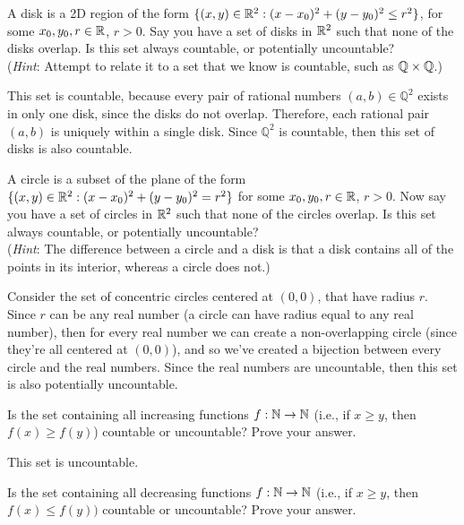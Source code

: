 \documentclass[11pt]{article}
\begin{document}
\begin{Parts}
    \Part
    A disk is a 2D region of the form $\{(x, y) \in \mathbb{R}^2 : (x - x_0)^2 + (y - y_0)^2 \le r^2\}$, for some $x_0, y_0, r \in \mathbb{R}$, $r > 0$.
    Say you have a set of disks in $\mathbb{R}^2$ such that none of the disks overlap.
    Is this set always countable, or potentially uncountable?\\
    (\textit{Hint}: Attempt to relate it to a set that we know is countable, such as $\mathbb{Q} \times \mathbb{Q}$.)

    \begin{solution}
      This set is countable, because every pair of rational numbers $(a, b) \in \mathbb Q^2$ exists in only one disk, since the disks do not overlap. Therefore, each rational pair $(a, b)$ is uniquely within a single disk. Since $\mathbb Q^2$ is countable, then this set of disks is also countable.
    \end{solution}
    
    \Part
    A circle is a subset of the plane of the form $\{(x, y) \in \mathbb{R}^2 : (x - x_0)^2 + (y - y_0)^2 = r^2\}$ for some $x_0, y_0, r \in \mathbb{R}$, $r > 0$. 
    Now say you have a set of circles in $\mathbb{R}^2$ such that none of the circles overlap.
    Is this set always countable, or potentially uncountable?\\
    (\textit{Hint}: The difference between a circle and a disk is that a disk contains all of the points in its interior, whereas a circle does not.)
    
    \begin{solution}
      Consider the set of concentric circles centered at $(0, 0)$, that have radius $r$. Since $r$ can be any real number (a circle can have radius equal to any real number), then for every real number we can create a non-overlapping circle (since they're all centered at $(0, 0)$), and so we've created a bijection between every circle and the real numbers. Since the real numbers are uncountable, then this set is also potentially uncountable.
    \end{solution}
    
    \Part
    Is the set containing all increasing functions $f : \mathbb{N} \rightarrow \mathbb{N}$ (i.e., if $x \geq y $, then $f(x) \geq f(y)$) countable or uncountable? Prove your answer.

    \begin{solution}
      This set is uncountable. 
    \end{solution}
    
    \Part
    Is the set containing all decreasing functions $f : \mathbb{N} \rightarrow \mathbb{N}$ (i.e., if $x \geq y$, then $f(x) \leq f(y))$ countable or uncountable? Prove your answer.

    \begin{solution}
      
    \end{solution}
\end{Parts}
\pagebreak
{}
\end{document}
